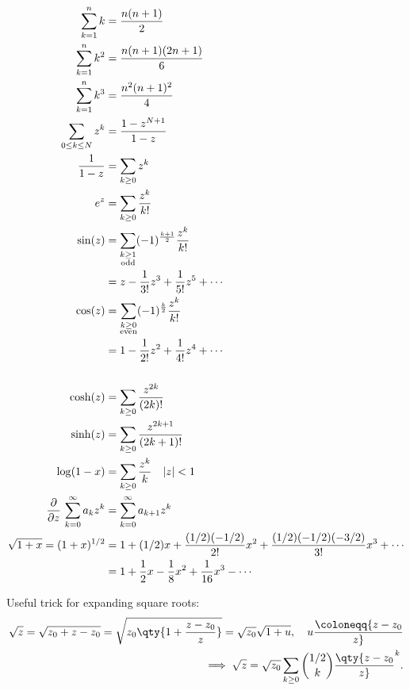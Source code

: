 \begin{fact}

\begin{align*}
\sum_{k=1}^{n} k 
  &=\frac{n(n+1)}{2} \\
\sum_{k=1}^{n} k^{2} 
  &=\frac{n(n+1)(2 n+1)}{6} \\
\sum_{k=1}^{n} k^{3} 
  &=\frac{n^{2}(n+1)^{2}}{4}  \\
\sum_{0\leq k \leq N} z^k 
  &= {1 - z^{N+1} \over 1-z} \\
{1\over 1-z} &= \sum_{k\geq 0} z^k \\
e^z &= \sum_{k\geq 0} {z^k \over k!} \\
\sin(z) 
  &= \sum_{\substack{ k \geq 1 \\ \text{odd} }} (-1)^{k+1 \over 2} {z^k \over k!} \\
  &= z - {1\over 3!}z^3 + {1\over 5!}z^5 + \cdots \\
\cos(z) 
  &= \sum_{\substack{ k \geq 0 \\ \text{even}} } (-1)^{k\over 2} {z^k \over k!} \\
  &= 1 - {1\over 2!}z^2 + {1\over 4!}z^4 + \cdots \\
  \\
\cosh(z) &= \sum_{k\geq 0} { z^{2k} \over (2k)! } \\
\sinh(z) &= \sum_{k\geq 0} { z^{2k+1} \over (2k+1)! } \\
\log(1-x) 
  &= \sum_{k \geq 0} {z^k\over k} \quad {\left\lvert {z} \right\rvert} < 1 \\
{\frac{\partial }{\partial z}\,} \sum_{k=0}^\infty a_k z^k 
  &= \sum_{k=0}^\infty a_{k+1}z^k \\
\sqrt{1+x} = (1+x)^{1/2} 
  &= 1 + (1/2)x + {(1/2)(-1/2) \over 2!}x^2 + {(1/2)(-1/2)(-3/2) \over 3!}x^3 + \cdots \\
  &= 1 + {1\over 2} x - {1\over 8}x^2 + {1\over 16}x^3 - \cdots
\end{align*}

\end{fact}

\begin{fact}

Useful trick for expanding square roots:
\begin{align*}
\sqrt{z} = \sqrt{z_0 + z - z_0} = \sqrt{z_0 \qty{ 1 + {z-z_0 \over z} }} = \sqrt{z_0} \sqrt{1+u},\quad u\coloneqq{z-z_0 \over z} \\
\implies \sqrt{z} = \sqrt{z_0} \sum_{k\geq 0} {1/2 \choose k} \qty{z- z_0 \over z}^k
.\end{align*}

\end{fact}

